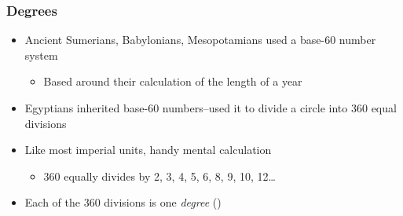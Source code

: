 \begin{frame}
	\frametitle{Degrees}

    \begin{itemize}[<+- | alert@+>]
        \item Ancient Sumerians, Babylonians, Mesopotamians used a base-60 number system
            \begin{itemize}
                \item Based around their calculation of the length of a year
            \end{itemize}
        \item Egyptians inherited base-60 numbers--used it to divide a circle into 360 equal divisions
        \item Like most imperial units, handy mental calculation
            \begin{itemize}
                \item 360 equally divides by 2, 3, 4, 5, 6, 8, 9, 10, 12\dots
            \end{itemize}
        \item Each of the 360 divisions is one \emph{degree} (\textdegree{})
    \end{itemize}
\end{frame}

